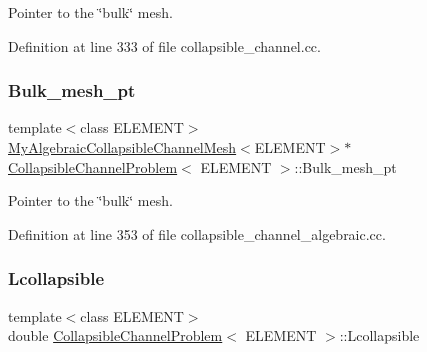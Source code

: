 Pointer to the \char`\"{}bulk\char`\"{} mesh. 



Definition at line 333 of file collapsible\+\_\+channel.\+cc.

\mbox{\label{classCollapsibleChannelProblem_a0c3c4c226afe7d14f6967ac6d28ff15f}} 
\subsubsection{\texorpdfstring{Bulk\+\_\+mesh\+\_\+pt}{Bulk\_mesh\_pt}\hspace{0.1cm}{\footnotesize\ttfamily [2/2]}}
{\footnotesize\ttfamily template$<$class E\+L\+E\+M\+E\+NT$>$ \\
\hyperlink{classoomph_1_1MyAlgebraicCollapsibleChannelMesh}{My\+Algebraic\+Collapsible\+Channel\+Mesh}$<$E\+L\+E\+M\+E\+NT$>$$\ast$ \hyperlink{classCollapsibleChannelProblem}{Collapsible\+Channel\+Problem}$<$ E\+L\+E\+M\+E\+NT $>$\+::Bulk\+\_\+mesh\+\_\+pt\hspace{0.3cm}{\ttfamily [private]}}



Pointer to the \char`\"{}bulk\char`\"{} mesh. 



Definition at line 353 of file collapsible\+\_\+channel\+\_\+algebraic.\+cc.

\mbox{\label{classCollapsibleChannelProblem_a4edf74f18e84c3a2170428322d9e6824}} 
\subsubsection{\texorpdfstring{Lcollapsible}{Lcollapsible}}
{\footnotesize\ttfamily template$<$class E\+L\+E\+M\+E\+NT$>$ \\
double \hyperlink{classCollapsibleChannelProblem}{Collapsible\+Channel\+Problem}$<$ E\+L\+E\+M\+E\+NT $>$\+::Lcollapsible\hspace{0.3cm}{\ttfamily [private]}}



